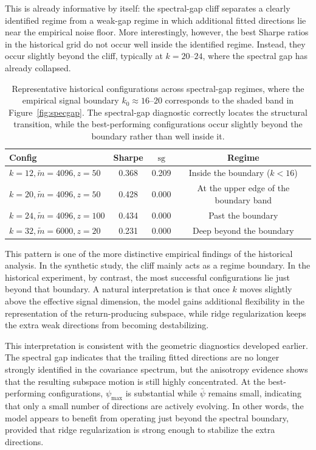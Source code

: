 \documentclass[11pt,letterpaper]{article}
\begin{document}
This is already informative by itself: the spectral-gap cliff separates a
clearly identified regime from a weak-gap regime in which additional fitted
directions lie near the empirical noise floor. More interestingly, however, the
best Sharpe ratios in the historical grid do not occur well inside the
identified regime. Instead, they occur slightly beyond the cliff, typically at
$k=20$--$24$, where the spectral gap has already collapsed.

\begin{table}[H]
	\centering\small
	\begin{tabular}{lccc}
		\toprule
		Config & Sharpe & $\mathrm{sg}$ & Regime \\
		\midrule
		$k=12, \tilde m=4096, z=50$  & 0.368 & 0.209 & Inside the boundary ($k<16$) \\
		$k=20, \tilde m=4096, z=50$  & 0.428 & 0.000 & At the upper edge of the boundary band \\
		$k=24, \tilde m=4096, z=100$ & 0.434 & 0.000 & Past the boundary \\
		$k=32, \tilde m=6000, z=20$  & 0.231 & 0.000 & Deep beyond the boundary \\
		\bottomrule
	\end{tabular}
	\caption{Representative historical configurations across spectral-gap
		regimes, where the empirical signal boundary $k_0\approx 16$--$20$
		corresponds to the shaded band in Figure~\ref{fig:specgap}. The
		spectral-gap diagnostic correctly locates the structural transition,
		while the best-performing configurations occur slightly beyond the
		boundary rather than well inside it.}
	\label{tab:specgap-summary}
\end{table}

This pattern is one of the more distinctive empirical findings of the
historical analysis. In the synthetic study, the cliff mainly acts as a regime
boundary. In the historical experiment, by contrast, the most successful
configurations lie just beyond that boundary. A natural interpretation is that
once $k$ moves slightly above the effective signal dimension, the model gains
additional flexibility in the representation of the return-producing subspace,
while ridge regularization keeps the extra weak directions from becoming
destabilizing.

This interpretation is consistent with the geometric diagnostics developed
earlier. The spectral gap indicates that the trailing fitted directions are no
longer strongly identified in the covariance spectrum, but the anisotropy
evidence shows that the resulting subspace motion is still highly concentrated.
At the best-performing configurations, $\psi_{\max}$ is substantial while
$\bar\psi$ remains small, indicating that only a small number of directions
are actively evolving. In other words, the model appears to benefit from
operating just beyond the spectral boundary, provided that ridge
regularization is strong enough to stabilize the extra directions.
\end{document}
